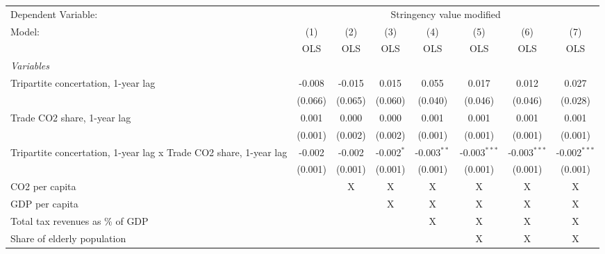 
\begingroup
\centering
\begin{tabular}{lccccccc}
   \toprule
   Dependent Variable: & \multicolumn{7}{c}{Stringency value modified}\\
   Model:                                                            & (1)     & (2)     & (3)          & (4)           & (5)            & (6)            & (7)\\  
                                                                     &  OLS    & OLS     & OLS          & OLS           & OLS            & OLS            & OLS\\  
   \midrule
   \emph{Variables}\\
   Tripartite concertation, 1-year lag                               & -0.008  & -0.015  & 0.015        & 0.055         & 0.017          & 0.012          & 0.027\\   
                                                                     & (0.066) & (0.065) & (0.060)      & (0.040)       & (0.046)        & (0.046)        & (0.028)\\   
   Trade CO2 share, 1-year lag                                       & 0.001   & 0.000   & 0.000        & 0.001         & 0.001          & 0.001          & 0.001\\   
                                                                     & (0.001) & (0.002) & (0.002)      & (0.001)       & (0.001)        & (0.001)        & (0.001)\\   
   Tripartite concertation, 1-year lag x Trade CO2 share, 1-year lag & -0.002  & -0.002  & -0.002$^{*}$ & -0.003$^{**}$ & -0.003$^{***}$ & -0.003$^{***}$ & -0.002$^{***}$\\   
                                                                     & (0.001) & (0.001) & (0.001)      & (0.001)       & (0.001)        & (0.001)        & (0.001)\\   
   CO2 per capita                                                    &         & X       & X            & X             & X              & X              & X\\  
   GDP per capita                                                    &         &         & X            & X             & X              & X              & X\\  
   Total tax revenues as \% of GDP                                   &         &         &              & X             & X              & X              & X\\  
   Share of elderly population                                       &         &         &              &               & X              & X              & X\\  

\end{tabular}
